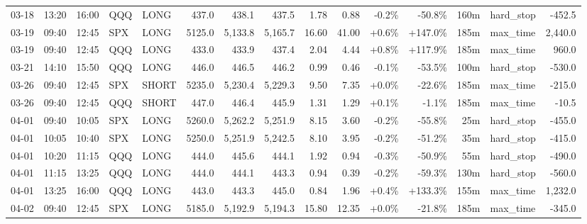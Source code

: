 \documentclass[11pt,a4paper,twoside]{article}
\begin{document}
\begin{landscape}
\begin{center}
\begin{longtable}{>{\color{txtmain}}l l l l l r r r r r r r r >{\color{txtmain}}l r}
03-18 & 13:20 & 16:00 & QQQ & LONG & 437.0 & 438.1 & 437.5 & 1.78 & 0.88 & \textcolor{lossred}{-0.2\%} & \textcolor{lossred}{-50.8\%} & 160m & hard\_stop & \textcolor{lossred}{-452.5} \\
03-19 & 09:40 & 12:45 & SPX & LONG & 5125.0 & 5,133.8 & 5,165.7 & 16.60 & 41.00 & \textcolor{wingreen}{+0.6\%} & \textcolor{wingreen}{+147.0\%} & 185m & max\_time & \textcolor{wingreen}{2,440.0} \\
03-19 & 09:40 & 12:45 & QQQ & LONG & 433.0 & 433.9 & 437.4 & 2.04 & 4.44 & \textcolor{wingreen}{+0.8\%} & \textcolor{wingreen}{+117.9\%} & 185m & max\_time & \textcolor{wingreen}{960.0} \\
03-21 & 14:10 & 15:50 & QQQ & LONG & 446.0 & 446.5 & 446.2 & 0.99 & 0.46 & \textcolor{lossred}{-0.1\%} & \textcolor{lossred}{-53.5\%} & 100m & hard\_stop & \textcolor{lossred}{-530.0} \\
03-26 & 09:40 & 12:45 & SPX & SHORT & 5235.0 & 5,230.4 & 5,229.3 & 9.50 & 7.35 & \textcolor{wingreen}{+0.0\%} & \textcolor{lossred}{-22.6\%} & 185m & max\_time & \textcolor{lossred}{-215.0} \\
03-26 & 09:40 & 12:45 & QQQ & SHORT & 447.0 & 446.4 & 445.9 & 1.31 & 1.29 & \textcolor{wingreen}{+0.1\%} & \textcolor{lossred}{-1.1\%} & 185m & max\_time & \textcolor{lossred}{-10.5} \\
04-01 & 09:40 & 10:05 & SPX & LONG & 5260.0 & 5,262.2 & 5,251.9 & 8.15 & 3.60 & \textcolor{lossred}{-0.2\%} & \textcolor{lossred}{-55.8\%} & 25m & hard\_stop & \textcolor{lossred}{-455.0} \\
04-01 & 10:05 & 10:40 & SPX & LONG & 5250.0 & 5,251.9 & 5,242.5 & 8.10 & 3.95 & \textcolor{lossred}{-0.2\%} & \textcolor{lossred}{-51.2\%} & 35m & hard\_stop & \textcolor{lossred}{-415.0} \\
04-01 & 10:20 & 11:15 & QQQ & LONG & 444.0 & 445.6 & 444.1 & 1.92 & 0.94 & \textcolor{lossred}{-0.3\%} & \textcolor{lossred}{-50.9\%} & 55m & hard\_stop & \textcolor{lossred}{-490.0} \\
04-01 & 11:15 & 13:25 & QQQ & LONG & 444.0 & 444.1 & 443.3 & 0.94 & 0.39 & \textcolor{lossred}{-0.2\%} & \textcolor{lossred}{-59.3\%} & 130m & hard\_stop & \textcolor{lossred}{-560.0} \\
04-01 & 13:25 & 16:00 & QQQ & LONG & 443.0 & 443.3 & 445.0 & 0.84 & 1.96 & \textcolor{wingreen}{+0.4\%} & \textcolor{wingreen}{+133.3\%} & 155m & max\_time & \textcolor{wingreen}{1,232.0} \\
04-02 & 09:40 & 12:45 & SPX & LONG & 5185.0 & 5,192.9 & 5,194.3 & 15.80 & 12.35 & \textcolor{wingreen}{+0.0\%} & \textcolor{lossred}{-21.8\%} & 185m & max\_time & \textcolor{lossred}{-345.0} \\

\end{longtable}
\end{center}
\end{landscape}
\end{document}
